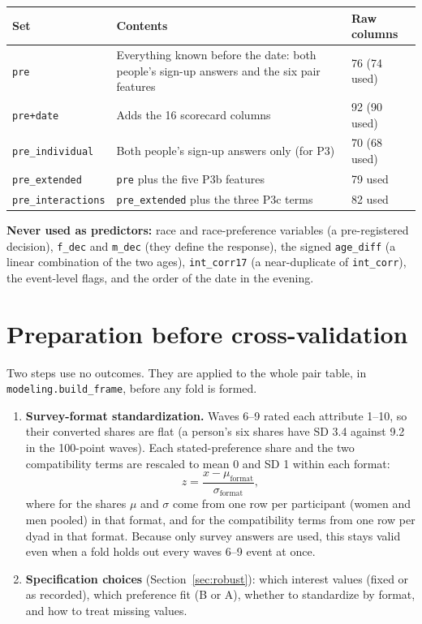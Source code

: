 \documentclass[11pt]{article}
\begin{document}
\small
\begin{center}
\begin{tabular}{L{3.2cm}L{9.4cm}L{2.6cm}}
\toprule
\textbf{Set} & \textbf{Contents} & \textbf{Raw columns} \\
\midrule
\texttt{pre} & Everything known before the date: both people's sign-up answers and the six pair features & 76 (74 used) \\
\texttt{pre+date} & Adds the 16 scorecard columns & 92 (90 used) \\
\texttt{pre\_individual} & Both people's sign-up answers only (for P3) & 70 (68 used) \\
\texttt{pre\_extended} & \texttt{pre} plus the five P3b features & 79 used \\
\texttt{pre\_interactions} & \texttt{pre\_extended} plus the three P3c terms & 82 used \\
\bottomrule
\end{tabular}
\end{center}
\par\medskip
\normalsize

\textbf{Never used as predictors:} race and race-preference variables (a pre-registered decision), \texttt{f\_dec} and \texttt{m\_dec} (they define the response), the signed \texttt{age\_diff} (a linear combination of the two ages), \texttt{int\_corr17} (a near-duplicate of \texttt{int\_corr}), the event-level flags, and the order of the date in the evening.

\section{Preparation before cross-validation}\label{sec:before}

Two steps use no outcomes. They are applied to the whole pair table, in \texttt{modeling.build\_frame}, before
any fold is formed.
\begin{enumerate}
\item \textbf{Survey-format standardization.} Waves 6--9 rated each attribute 1--10, so their converted shares are
flat (a person's six shares have SD 3.4 against 9.2 in the 100-point waves). Each stated-preference share and the two
compatibility terms are rescaled to mean 0 and SD 1 within each format:
\[
z = \frac{x - \mu_{\text{format}}}{\sigma_{\text{format}}},
\]
where for the shares $\mu$ and $\sigma$ come from one row per participant (women and men pooled) in that format, and
for the compatibility terms from one row per dyad in that format. Because only survey answers are used, this stays
valid even when a fold holds out every waves 6--9 event at once.
\item \textbf{Specification choices} (Section~\ref{sec:robust}): which interest values (fixed or as recorded), which
preference fit (B or A), whether to standardize by format, and how to treat missing values.
\end{enumerate}
\end{document}
